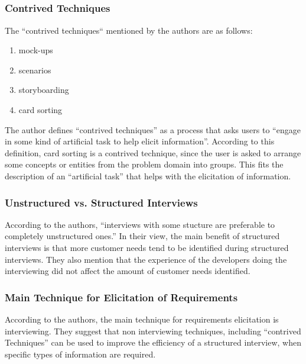 \documentclass[letterpaper,12pt]{article}
\begin{document}
\subsection{}

\subsubsection{Contrived Techniques}
The ``contrived techniques`` mentioned by the authors are as follows:
\begin{enumerate}
 \item mock-ups
 \item scenarios
 \item storyboarding
 \item card sorting
\end{enumerate}
The author defines ``contrived techniques'' as a process that asks users to
``engage in some kind of artificial task to help elicit information''. According
to this definition, card sorting is a contrived technique, since the user is
asked to arrange some concepts or entities from the problem domain into groups.
This fits the description of an ``artificial task'' that helps with the
elicitation of information.

\subsubsection{Unstructured vs. Structured Interviews}

According to the authors, ``interviews with some stucture are preferable to
completely unstructured ones.'' In their view, the main benefit of  structured
interviews is that more customer needs tend to be identified during structured
interviews. They also mention that the experience of the developers doing the
interviewing did not affect the amount of customer needs identified.


\subsubsection{Main Technique for Elicitation of Requirements}

According to the authors, the main technique for requirements elicitation is
interviewing. They suggest that non interviewing techniques, including
``contrived Techniques'' can be used to improve the efficiency of
a structured interview, when specific types of information are
required.
\end{document}
